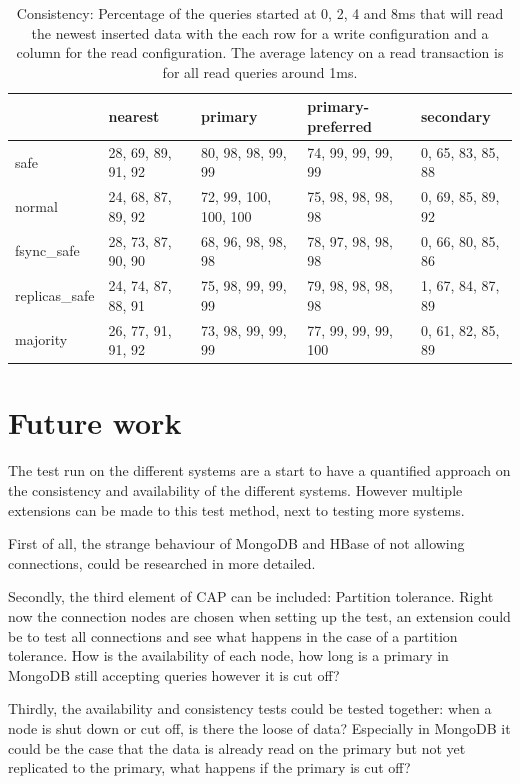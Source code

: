 \documentclass[final,5p,times]{elsarticle}
\begin{document}
\begin{table}
\centering
\begin{tabular}{l | l l l l}
& nearest & primary & primary- \newline preferred & secondary \\ 
  \hline
safe & 28, 69, 89, 91, 92 & 80, 98, 98, 99, 99 & 74, 99, 99, 99, 99 & 0, 65, 83, 85, 88 \\ 
  normal & 24, 68, 87, 89, 92 & 72, 99, 100, 100, 100 & 75, 98, 98, 98, 98 & 0, 69, 85, 89, 92 \\ 
  fsync\_safe & 28, 73, 87, 90, 90 & 68, 96, 98, 98, 98 & 78, 97, 98, 98, 98 & 0, 66, 80, 85, 86 \\ 
  replicas\_safe & 24, 74, 87, 88, 91 & 75, 98, 99, 99, 99 & 79, 98, 98, 98, 98 & 1, 67, 84, 87, 89 \\ 
  majority & 26, 77, 91, 91, 92 & 73, 98, 99, 99, 99 & 77, 99, 99, 99, 100 & 0, 61, 82, 85, 89 \\ 
\end{tabular}
	\caption{Consistency: Percentage of the queries started at 0, 2, 4 and 8ms  that will read the newest inserted data with the each row for a write configuration and a column for the read configuration. The average latency on a read transaction is for all read queries around 1ms. }
	\label{table:consistentie-mongodb-correct}
\end{table}


\section{Future work}\label{sec:futurework}
The test run on the different systems are a start to have a quantified approach on the consistency and availability of the different systems. However multiple extensions can be made to this test method, next to testing more systems. 

First of all, the strange behaviour of MongoDB and HBase of not allowing connections, could be researched in more detailed. 

Secondly, the third element of CAP can be included: Partition tolerance. Right now the connection nodes are chosen when setting up the test, an extension could be to test all connections and see what happens in the case of a partition tolerance. How is the availability of each node, how long is a primary in MongoDB still accepting queries however it is cut off? 

Thirdly, the availability and consistency tests could be tested together: when a node is shut down or cut off, is there the loose of data? Especially in MongoDB it could be the case that the data is already read on the primary but not yet replicated to the primary, what happens if the primary is cut off? 
\end{document}
